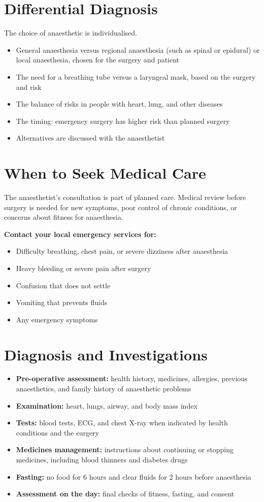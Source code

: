 \section*{Differential Diagnosis}
The choice of anaesthetic is individualised.
\begin{itemize}
    \item General anaesthesia versus regional anaesthesia (such as spinal or epidural) or local anaesthesia, chosen for the surgery and patient
    \item The need for a breathing tube versus a laryngeal mask, based on the surgery and risk
    \item The balance of risks in people with heart, lung, and other diseases
    \item The timing: emergency surgery has higher risk than planned surgery
    \item Alternatives are discussed with the anaesthetist
\end{itemize}

\section*{When to Seek Medical Care}
The anaesthetist's consultation is part of planned care. Medical review before surgery is needed for new symptoms, poor control of chronic conditions, or concerns about fitness for anaesthesia.

\textbf{Contact your local emergency services for:}
\begin{itemize}
    \item Difficulty breathing, chest pain, or severe dizziness after anaesthesia
    \item Heavy bleeding or severe pain after surgery
    \item Confusion that does not settle
    \item Vomiting that prevents fluids
    \item Any emergency symptoms
\end{itemize}

\section*{Diagnosis and Investigations}
\begin{itemize}
    \item \textbf{Pre-operative assessment:} health history, medicines, allergies, previous anaesthetics, and family history of anaesthetic problems
    \item \textbf{Examination:} heart, lungs, airway, and body mass index
    \item \textbf{Tests:} blood tests, ECG, and chest X-ray when indicated by health conditions and the surgery
    \item \textbf{Medicines management:} instructions about continuing or stopping medicines, including blood thinners and diabetes drugs
    \item \textbf{Fasting:} no food for 6 hours and clear fluids for 2 hours before anaesthesia
    \item \textbf{Assessment on the day:} final checks of fitness, fasting, and consent
\end{itemize}

